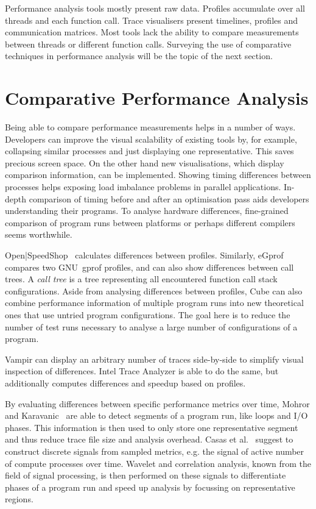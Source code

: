 \documentclass[a4paper, final, diplominf]{zih-template}
\begin{document}
Performance analysis tools mostly present raw data.
Profiles accumulate over all threads and each function call.
Trace visualisers present timelines, profiles and communication matrices.
Most tools lack the ability to compare measurements between threads or different function calls.
Surveying the use of comparative techniques in performance analysis will be the topic of the next section.

\section{Comparative Performance Analysis}
\label{sec:background-comparative}
Being able to compare performance measurements helps in a number of ways.
Developers can improve the visual scalability of existing tools by, for example, collapsing similar processes and just displaying one representative.
This saves precious screen space.
On the other hand new visualisations, which display comparison information, can be implemented.
Showing timing differences between processes helps exposing load imbalance problems in parallel applications.
In-depth comparison of timing before and after an optimisation pass aids developers understanding their programs.
To analyse hardware differences, fine-grained comparison of program runs between platforms or perhaps different compilers seems worthwhile.

Open|SpeedShop~\cite{schulz08} calculates differences between profiles.
Similarly, eGprof~\cite{schulz07} compares two GNU~gprof profiles, and can also show differences between call trees.
A \emph{call tree} is a tree representing all encountered function call stack configurations.
Aside from analysing differences between profiles, Cube can also combine performance information of multiple program runs into new theoretical ones that use untried program configurations.
The goal here is to reduce the number of test runs necessary to analyse a large number of configurations of a program.

Vampir can display an arbitrary number of traces side-by-side to simplify visual inspection of differences.
Intel Trace Analyzer is able to do the same, but additionally computes differences and speedup based on profiles.

By evaluating differences between specific performance metrics over time, Mohror and Karavanic~\cite{mohror09} are able to detect segments of a program run, like loops and I/O phases.
This information is then used to only store one representative segment and thus reduce trace file size and analysis overhead.
Casas et al.~\cite{casas10} suggest to construct discrete signals from sampled metrics, e.g. the signal of active number of compute processes over time.
Wavelet and correlation analysis, known from the field of signal processing, is then performed on these signals to differentiate phases of a program run and speed up analysis by focussing on representative regions.
\end{document}
